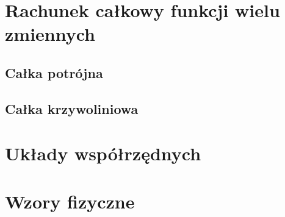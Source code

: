 \documentclass[11pt]{scrartcl}
\begin{document}
    \section{Rachunek całkowy funkcji wielu zmiennych}
    
        \subsection{Całka potrójna}
        
        \subsection{Całka krzywoliniowa}
        


    \appendix

    \section{Układy współrzędnych} \label{s:coordinate systems}
    

    \section{Wzory fizyczne} \label{s:physics formulas}
    
\end{document}
